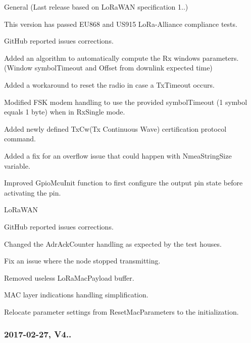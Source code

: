 \begin{DoxyItemize}
\item General (Last release based on Lo\+Ra\+W\+AN specification 1..)
\begin{DoxyEnumerate}
\item This version has passed E\+U868 and U\+S915 Lo\+Ra-\/\+Alliance compliance tests.
\item Git\+Hub reported issues corrections.
\item Added an algorithm to automatically compute the Rx windows parameters. (Window symbol\+Timeout and Offset from downlink expected time)
\item Added a workaround to reset the radio in case a Tx\+Timeout occurs.
\item Modified F\+SK modem handling to use the provided symbol\+Timeout (1 symbol equals 1 byte) when in Rx\+Single mode.
\item Added newly defined Tx\+Cw(\+Tx Continuous Wave) certification protocol command.
\item Added a fix for an overflow issue that could happen with Nmea\+String\+Size variable.
\item Improved Gpio\+Mcu\+Init function to first configure the output pin state before activating the pin.
\end{DoxyEnumerate}
\item Lo\+Ra\+W\+AN
\begin{DoxyEnumerate}
\item Git\+Hub reported issues corrections.
\item Changed the Adr\+Ack\+Counter handling as expected by the test houses.
\item Fix an issue where the node stopped transmitting.
\item Removed useless Lo\+Ra\+Mac\+Payload buffer.
\item M\+AC layer indications handling simplification.
\item Relocate parameter settings from Reset\+Mac\+Parameters to the initialization.
\end{DoxyEnumerate}
\end{DoxyItemize}

\subsubsection*{2017-\/02-\/27, V4..}


